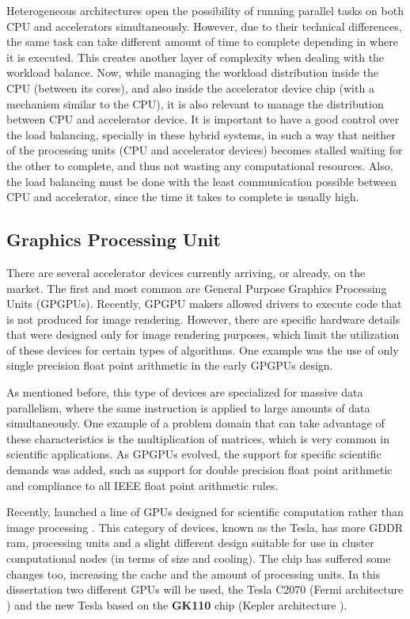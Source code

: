 Heterogeneous architectures open the possibility of running parallel tasks on both CPU and accelerators simultaneously. However, due to their technical differences, the same task can take different amount of time to complete depending in where it is executed. This creates another layer of complexity when dealing with the workload balance. Now, while managing the workload distribution inside the CPU (between its cores), and also inside the accelerator device chip (with a mechanism similar to the CPU), it is also relevant to manage the distribution between CPU and accelerator device. It is important to have a good control over the load balancing, specially in these hybrid systems, in such a way that neither of the processing units (CPU and accelerator devices) becomes stalled waiting for the other to complete, and thus not wasting any computational resources. Also, the load balancing must be done with the least communication possible between CPU and accelerator, since the time it takes to complete is usually high.

\subsection{Graphics Processing Unit}

There are several accelerator devices currently arriving, or already, on the market. The first and most common are General Purpose Graphics Processing Units (GPGPUs). Recently, GPGPU makers allowed drivers to execute code that is not produced for image rendering. However, there are specific hardware details that were designed only for image rendering purposes, which limit the utilization of these devices for certain types of algorithms. One example was the use of only single precision float point arithmetic in the early GPGPUs design.

As mentioned before, this type of devices are specialized for massive data parallelism, where the same instruction is applied to large amounts of data simultaneously. One example of a problem domain that can take advantage of these characteristics is the multiplication of matrices, which is very common in scientific applications. As GPGPUs evolved, the support for specific scientific demands was added, such as support for double precision float point arithmetic and compliance to all IEEE float point arithmetic rules.

Recently, \nvidia \cite{NVIDIA} launched a line of GPUs designed for scientific computation rather than image processing \cite{NVIDIA:Tesla}. This category of devices, known as the Tesla, has more GDDR ram, processing units and a slight different design suitable for use in cluster computational nodes (in terms of size and cooling). The chip has suffered some changes too, increasing the cache and the amount of processing units. In this dissertation two different \nvidia GPUs will be used, the \nvidia Tesla C2070 (Fermi architecture \cite{NVIDIA:Fermi}) and the new \nvidia Tesla based on the \textbf{GK110} chip (Kepler architecture \cite{NVIDIA:Kepler}).

